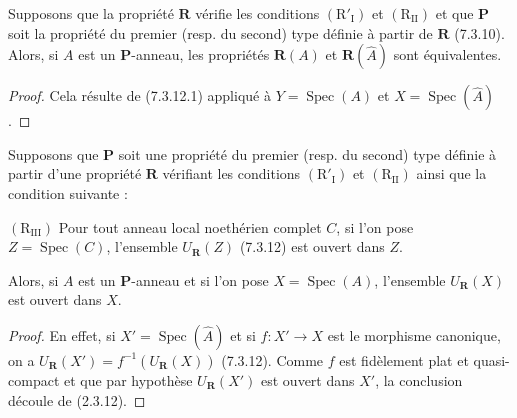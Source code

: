 \begin{proposition}[7.3.17]
\label{IV.2.s7.3.17-fr}
Supposons que la propriété $\boldsymbol R$ vérifie les conditions
$(\mathrm R'_{\mathrm I})$ et $(\mathrm R_{\mathrm{II}})$ et que
$\boldsymbol P$ soit la propriété du premier \textup{(resp.} du second) type
définie à partir de $\boldsymbol R$ \textup{(7.3.10)}. Alors, si $A$ est un
$\boldsymbol P$-anneau, les propriétés $\boldsymbol R(A)$ et
$\boldsymbol R(\widehat A)$ sont équivalentes.
\end{proposition}

\begin{proof}
Cela résulte de (7.3.12.1) appliqué à
$Y=\operatorname{Spec}(A)$ et $X=\operatorname{Spec}(\widehat A)$.
\end{proof}

\begin{proposition}[7.3.18]
\label{IV.2.s7.3.18-fr}
Supposons que $\boldsymbol P$ soit une propriété du premier \textup{(resp.} du
second) type définie à partir d'une propriété $\boldsymbol R$ vérifiant
les conditions $(\mathrm R'_{\mathrm I})$ et
$(\mathrm R_{\mathrm{II}})$ ainsi que la condition suivante :

$(\mathrm R_{\mathrm{III}})$ Pour tout anneau local noethérien \textup{complet}
$C$, si l'on pose $Z=\operatorname{Spec}(C)$, l'ensemble
$U_{\mathbf{R}}(Z)$ \textup{(7.3.12)} est ouvert dans $Z$.

Alors, si $A$ est un $\boldsymbol P$-anneau et si l'on pose
$X=\operatorname{Spec}(A)$, l'ensemble $U_{\mathbf{R}}(X)$ est ouvert
dans $X$.
\end{proposition}

\begin{proof}
En effet, si $X'=\operatorname{Spec}(\widehat A)$ et si $f:X'\to X$ est
le morphisme canonique, on a
$U_{\mathbf{R}}(X')=f^{-1}(U_{\mathbf{R}}(X))$ (7.3.12). Comme $f$
est fidèlement plat et quasi-compact et que par hypothèse
$U_{\mathbf{R}}(X')$ est ouvert dans $X'$, la conclusion découle de
(2.3.12).
\end{proof}

